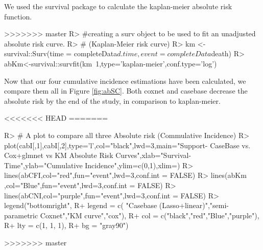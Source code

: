 \documentclass[
]{jss}
\begin{document}
\begin{CodeChunk}
\begin{CodeInput}
\begin{CodeChunk}

\end{CodeChunk}

We used the survival package to calculate the kaplan-meier absolute risk
function.

\begin{CodeChunk}

\begin{CodeInput}
>>>>>>> master
R> #creating a surv object to be used to fit an unadjusted absolute risk curve.
R> # (Kaplan-Meier risk curve)
R> km <- survival::Surv(time = completeData$d.time, event = completeData$death)
R> abKm<-survival::survfit(km~1,type='kaplan-meier',conf.type='log')
\end{CodeInput}
\end{CodeChunk}

Now that our four cumulative incidence estimations have been calculated,
we compare them all in Figure \ref{fig:abSC}. Both coxnet and casebase
decrease the absolute risk by the end of the study, in comparison to
kaplan-meier.

\begin{CodeChunk}
<<<<<<< HEAD
=======

\begin{CodeInput}
R> # A plot to compare all three Absolute risk (Commulative Incidence)
R> plot(cabI[,1],cabI[,2],type='l',col="black",lwd=3,main="Support- CaseBase vs. Cox+glmnet vs KM Absolute Risk Curves",xlab="Survival-Time",ylab="Cumulative Incidence",ylim=c(0,1),xlim=)
R> lines(abCFI,col="red",fun="event",lwd=3,conf.int = FALSE)
R> lines(abKm ,col="Blue",fun="event",lwd=3,conf.int = FALSE)
R> lines(abCNI,col="purple",fun="event",lwd=3,conf.int = FALSE)
R> legend("bottomright", 
R+        legend = c( "Casebase (Lasso+linear)","semi-parametric Coxnet","KM curve","cox"), 
R+        col = c("black","red","Blue","purple"),
R+        lty = c(1, 1, 1), 
R+        bg = "gray90")
\end{CodeInput}
>>>>>>> master
\begin{figure}


\end{figure}
\end{CodeChunk}
\end{CodeInput}
\end{CodeChunk}
\end{document}

